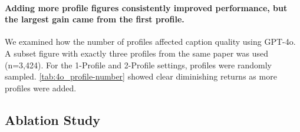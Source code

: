 




\paragraph{Adding more profile figures consistently improved performance, but the largest gain came from the first profile.}
We examined how the number of profiles affected caption quality using GPT-4o. 
A subset figure with exactly three profiles from the same paper was used (n=3,424). 
For the 1-Profile and 2-Profile settings, profiles were randomly sampled. 
\autoref{tab:4o_profile-number} showed clear diminishing returns as more profiles were added.





\subsection{Ablation Study\label{sec:ablation}}


